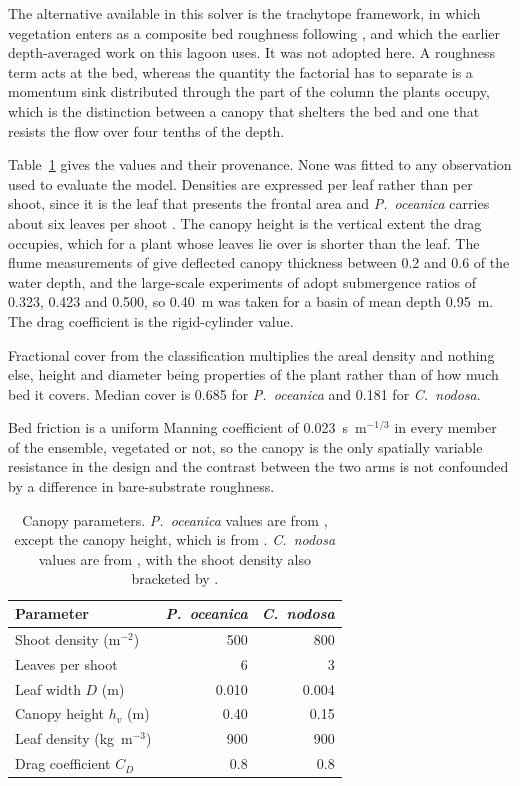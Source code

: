 The alternative available in this solver is the trachytope framework, in which
vegetation enters as a composite bed roughness following \citet{Baptist2007},
and which the earlier depth-averaged work on this lagoon uses. It was not
adopted here. A roughness term acts at the bed, whereas the quantity the
factorial has to separate is a momentum sink distributed through the part of
the column the plants occupy, which is the distinction between a canopy that
shelters the bed and one that resists the flow over four tenths of the depth.

Table~\ref{tab:veg} gives the values and their provenance. None was fitted to
any observation used to evaluate the model. Densities are expressed per leaf
rather than per shoot, since it is the leaf that presents the frontal area and
\emph{P.\ oceanica} carries about six leaves per shoot
\citep{CiraoloFerreri2006}. The canopy height is the vertical extent the drag
occupies, which for a plant whose leaves lie over is shorter than the leaf. The
flume measurements of \citet{CiraoloFerreri2006} give deflected canopy thickness
between 0.2 and 0.6 of the water depth, and the large-scale experiments of
\citet{Prinos2010} adopt submergence ratios of 0.323, 0.423 and 0.500, so
0.40~m was taken for a basin of mean depth 0.95~m. The drag coefficient is the
rigid-cylinder value.

Fractional cover from the classification multiplies the areal density and
nothing else, height and diameter being properties of the plant rather than of
how much bed it covers. Median cover is 0.685 for \emph{P.\ oceanica} and 0.181
for \emph{C.\ nodosa}.

Bed friction is a uniform Manning coefficient of 0.023~s~m$^{-1/3}$ in every
member of the ensemble, vegetated or not, so the canopy is the only spatially
variable resistance in the design and the contrast between the two arms is not
confounded by a difference in bare-substrate roughness.

\begin{table}[H]
  \centering
  \caption{Canopy parameters. \emph{P.\ oceanica} values are from
  \citet{CiraoloFerreri2006}, except the canopy height, which is from
  \citet{Prinos2010}. \emph{C.\ nodosa} values are from \citet{Morris2008},
  with the shoot density also bracketed by \citet{Cancemi2002}.}
  \label{tab:veg}
  \begin{tabular}{lrr}
    \toprule
    Parameter & \emph{P.\ oceanica} & \emph{C.\ nodosa} \\
    \midrule
    Shoot density (m$^{-2}$)      & 500   & 800   \\
    Leaves per shoot              & 6     & 3     \\
    Leaf width $D$ (m)            & 0.010 & 0.004 \\
    Canopy height $h_v$ (m)       & 0.40  & 0.15  \\
    Leaf density (kg~m$^{-3}$)    & 900   & 900   \\
    Drag coefficient $C_D$        & 0.8   & 0.8   \\
    \bottomrule
  \end{tabular}
\end{table}

